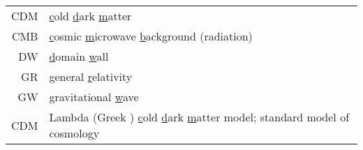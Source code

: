 





\begin{tabular*}{\linewidth}{ r l }
    CDM & \underline{c}old \underline{d}ark \underline{m}atter \\
    CMB & \underline{c}osmic \underline{m}icrowave \underline{b}ackground (radiation) \\
    DW& \underline{d}omain \underline{w}all \\
    GR& \underline{g}eneral \underline{r}elativity \\
    GW& \underline{g}ravitational \underline{w}ave\\
    \textLambda{}CDM & Lambda (Greek \underline{\textLambda{}}) \underline{c}old \underline{d}ark \underline{m}atter model; standard model of cosmology \\
\end{tabular*}